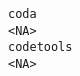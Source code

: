 \documentclass[
  letterpaper,
  DIV=11,
  numbers=noendperiod]{scrreprt}
\begin{document}
\begin{verbatim}
coda                                                                                                                                                                                                                                                                                                                                                                                                                                                                                                                                                                                                                                                                                                                                                                                                                                                                                                                                                                                                                                                                                                                                                                                                                                                                                                     <NA>
codetools                                                                                                                                                                                                                                                                                                                                                                                                                                                                                                                                                                                                                                                                                                                                                                                                                                                                                                                                                                                                                                                                                                                                                                                                                                                                                                <NA>

\end{verbatim}
\end{document}
